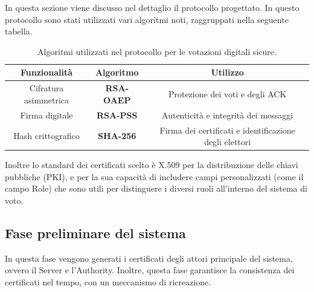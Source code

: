 In questa sezione viene discusso nel dettaglio il protocollo progettato. In questo protocollo sono stati utilizzati vari algoritmi noti, raggruppati nella seguente tabella.

\begin{table}[H]
	\centering
	\renewcommand{\arraystretch}{1.3}
	\begin{tabular}{|c|c|c|}
		\hline
		\textbf{Funzionalità} & \textbf{Algoritmo} & \textbf{Utilizzo} \\
		\hline
		Cifratura asimmetrica & \textbf{RSA-OAEP} & Protezione dei voti e degli ACK \\
		\hline
		Firma digitale & \textbf{RSA-PSS} & Autenticità e integrità dei messaggi \\ 
		\hline
		Hash crittografico & \textbf{SHA-256} & Firma dei certificati e identificazione degli elettori \\
		\hline
	\end{tabular}
	\caption{Algoritmi utilizzati nel protocollo per le votazioni digitali sicure.}
	\label{tab:algoritmi}
\end{table}
Inoltre lo standard dei certificati scelto è X.509 per la distribuzione delle chiavi pubbliche (PKI), e per la sua capacità di includere campi personalizzati (come il campo Role) che sono utili per distinguere i diversi ruoli all'interno del sistema di voto. \\

\newpage

\subsection{Fase preliminare del sistema}
In questa fase vengono generati i certificati degli attori principale del sistema, ovvero il Server e l'Authority. Inoltre, questa fase garantisce la consistenza dei certificati nel tempo, con un meccanismo di ricreazione.

\begin{figure}[H]
	\centering
	\scalebox{0.7}{}
\end{figure}

